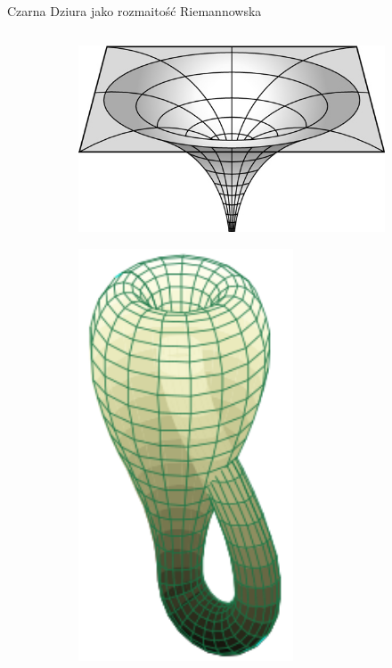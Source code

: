 \documentclass[polish, 9pt, xcolor=table, hyperref={pdfpagemode=FullScreen}]{beamer}
\begin{document}
\begin{frame}{Czarna Dziura jako rozmaitość Riemannowska}
\begin{columns}
\begin{column}{0.6\textwidth}
\begin{figure}
\centering
    \begin{subfigure}[t]{0.4\textwidth}
        \includegraphics[width=\textwidth]{ilustracje/dziura.jpg} 
    \end{subfigure}
    \begin{subfigure}[b]{0.4\textwidth}
        \includegraphics[width=0.7\textwidth]{ilustracje/rozmaitosc2.svg.png}

\end{subfigure}
\end{figure}
\end{column}
\end{columns}
\end{frame}
\end{document}
